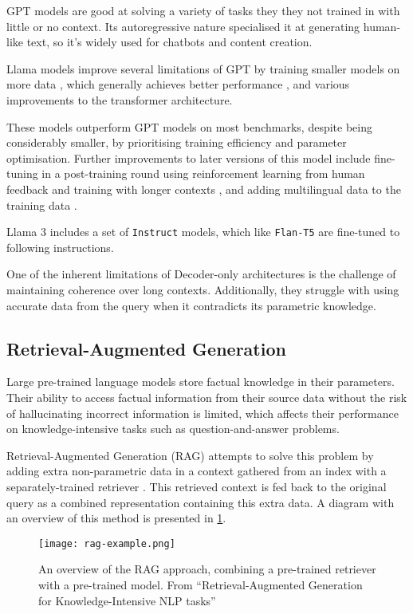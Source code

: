 GPT models are good at solving a variety of tasks they they not trained in with little or no context.
Its autoregressive nature specialised it at generating human-like text, so it's widely used for chatbots and content creation.

Llama models improve several limitations of GPT by training smaller models on more data \citep{llama}, which generally achieves better performance \citep{hoffmanetal}, and various improvements to the transformer architecture.

These models outperform GPT models on most benchmarks, despite being considerably smaller, by prioritising training efficiency and parameter optimisation.
Further improvements to later versions of this model include fine-tuning in a post-training round using reinforcement learning from human feedback and training with longer contexts \citep{llama2}, and adding multilingual data to the training data \citep{llama3}.

Llama 3 includes a set of \texttt{Instruct} models, which like \texttt{Flan-T5} are fine-tuned to following instructions.

One of the inherent limitations of Decoder-only architectures is the challenge of maintaining coherence over long contexts.
Additionally, they struggle with using accurate data from the query when it contradicts its parametric knowledge.

\subsection{Retrieval-Augmented Generation}

Large pre-trained language models store factual knowledge in their parameters.
Their ability to access factual information from their source data without the risk of hallucinating incorrect information is limited, which affects their performance on knowledge-intensive tasks such as question-and-answer problems.

Retrieval-Augmented Generation (RAG) attempts to solve this problem by adding extra non-parametric data in a context gathered from an index with a separately-trained retriever \citep{rag}.
This retrieved context is fed back to the original query as a combined representation containing this extra data.
A diagram with an overview of this method is presented in \cref{rag_overview}.

\begin{figure}[htp]
	\centering
	\texttt{[image: rag-example.png]}
	\caption{An overview of the RAG approach, combining a pre-trained retriever with a pre-trained model. From ``Retrieval-Augmented Generation for Knowledge-Intensive NLP tasks'' \citep{rag}}
	\label{rag_overview}
\end{figure}

